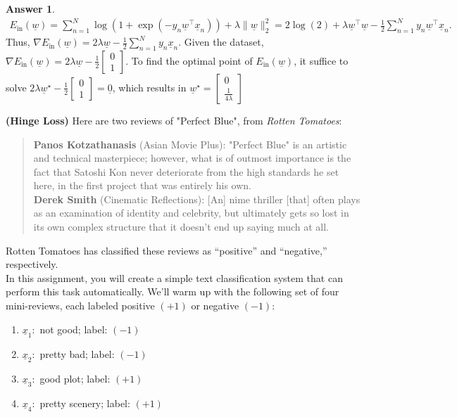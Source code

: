 \documentclass{article}
\theoremstyle{definition}
\newtheorem*{answer}{Answer}
\begin{document}
\begin{question}
\begin{question}
\begin{answer}
\begin{align*}
				E_{\text{in}}(\underline{w}) =  \sum_{n=1}^N \log(1 + \exp(-y_n \underline{w}^\top \underline{x}_n)) + \lambda \|\underline{w}\|_2^2 = 2\log(2) + \lambda \underline{w}^\top\underline{w}- \frac{1}{2} \sum_{n=1}^N y_n \underline{w}^\top \underline{x}_n.
			\end{align*}
			Thus, $\nabla  E_{\text{in}}(\underline{w}) = 2\lambda \underline{w} - \frac{1}{2} \sum_{n=1}^N y_n \underline{x}_n$. Given the dataset, $\nabla  E_{\text{in}}(\underline{w}) = 2\lambda \underline{w} - \frac{1}{2}\begin{bmatrix}
			0\\
			1
			\end{bmatrix}.$ To find the optimal point of $E_{\text{in}}(\underline{w})$, it suffice to solve $2\lambda \underline{w}^\star - \frac{1}{2}\begin{bmatrix}
			0\\
			1
			\end{bmatrix} = \underline{0}$, which results in $\underline{w}^\star = \begin{bmatrix}
			0\\
			\frac{1}{4 \lambda}
			\end{bmatrix}$
			
		\end{answer}
	\end{question}
	\item \textbf{(Hinge Loss)} Here are two reviews of "Perfect Blue", from \textit{Rotten Tomatoes}:
	\begin{quote}
		\textbf{Panos Kotzathanasis} (Asian Movie Plus): "Perfect Blue" is an artistic and technical masterpiece; however, what is of outmost importance is the fact that Satoshi Kon never deteriorate from the high standards he set here, in the first project that was entirely his own.\\
		
		\textbf{Derek Smith} (Cinematic Reflections): [An] nime thriller [that] often plays as an examination of identity and celebrity, but ultimately gets so lost in its own complex structure that it doesn't end up saying much at all.
	\end{quote}
	
	Rotten Tomatoes has classified these reviews as ``positive'' and ``negative,'' respectively.\\
	
	In this assignment, you will create a simple text classification system that can perform this task automatically. We'll warm up with the following set of four mini-reviews, each labeled positive $(+1)$ or negative $(-1)$:
	\begin{enumerate}
		\item $\underline{x}_1:$ not good; label: $(-1)$
		\item $\underline{x}_2:$ pretty bad; label: $(-1)$
		\item $\underline{x}_3:$ good plot; label: $(+1)$
		\item $\underline{x}_4:$ pretty scenery; label: $(+1)$
	\end{enumerate}
	

\end{question}
\end{document}
